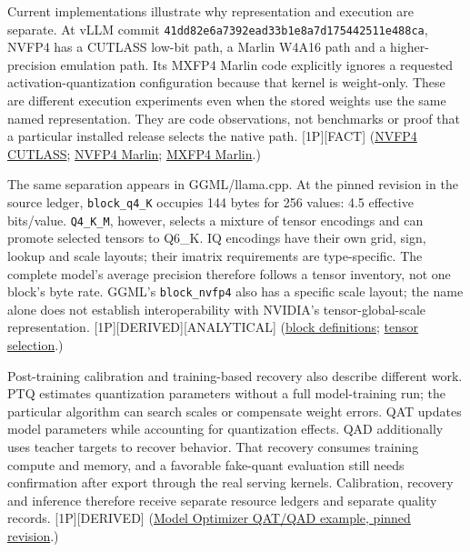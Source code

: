Current implementations illustrate why representation and execution are
separate. At vLLM commit
\texttt{41dd82e6a7392ead33b1e8a7d175442511e488ca}, NVFP4 has a CUTLASS
low-bit path, a Marlin W4A16 path and a higher-precision emulation path.
Its MXFP4 Marlin code explicitly ignores a requested
activation-quantization configuration because that kernel is
weight-only. These are different execution experiments even when the
stored weights use the same named representation. They are code
observations, not benchmarks or proof that a particular installed
release selects the native path. \mbox{{[}1P{]}}\hspace{0pt}\mbox{{[}FACT{]}}
(\href{https://github.com/vllm-project/vllm/blob/41dd82e6a7392ead33b1e8a7d175442511e488ca/vllm/model_executor/kernels/linear/nvfp4/cutlass.py}{NVFP4
CUTLASS};
\href{https://github.com/vllm-project/vllm/blob/41dd82e6a7392ead33b1e8a7d175442511e488ca/vllm/model_executor/kernels/linear/nvfp4/marlin.py}{NVFP4
Marlin};
\href{https://github.com/vllm-project/vllm/blob/41dd82e6a7392ead33b1e8a7d175442511e488ca/vllm/model_executor/kernels/linear/mxfp4/marlin.py}{MXFP4
Marlin}.)

The same separation appears in GGML/llama.cpp. At the pinned revision in
the source ledger, \texttt{block\_q4\_K} occupies 144 bytes for 256
values: 4.5 effective bits/value. \texttt{Q4\_K\_M}, however, selects a
mixture of tensor encodings and can promote selected tensors to Q6\_K.
IQ encodings have their own grid, sign, lookup and scale layouts; their
imatrix requirements are type-specific. The complete model's average
precision therefore follows a tensor inventory, not one block's byte
rate. GGML's \texttt{block\_nvfp4} also has a specific scale layout; the
name alone does not establish interoperability with NVIDIA's
tensor-global-scale representation.
\mbox{{[}1P{]}}\hspace{0pt}\mbox{{[}DERIVED{]}}\hspace{0pt}\mbox{{[}ANALYTICAL{]}}
(\href{https://github.com/ggml-org/llama.cpp/blob/8ca4060b7e30e76baaa5670ee1ec1b760b7f8552/ggml/src/ggml-common.h}{block
definitions};
\href{https://github.com/ggml-org/llama.cpp/blob/8ca4060b7e30e76baaa5670ee1ec1b760b7f8552/src/llama-quant.cpp}{tensor
selection}.)

Post-training calibration and training-based recovery also describe
different work. PTQ estimates quantization parameters without a full
model-training run; the particular algorithm can search scales or
compensate weight errors. QAT updates model parameters while accounting
for quantization effects. QAD additionally uses teacher targets to
recover behavior. That recovery consumes training compute and memory,
and a favorable fake-quant evaluation still needs confirmation after
export through the real serving kernels. Calibration, recovery and
inference therefore receive separate resource ledgers and separate
quality records. \mbox{{[}1P{]}}\hspace{0pt}\mbox{{[}DERIVED{]}}
(\href{https://github.com/NVIDIA/Model-Optimizer/blob/580ffff1cddb9b20a38b7434e6290654ebf96a8f/examples/llm_qat/README.md}{Model
Optimizer QAT/QAD example, pinned revision}.)

